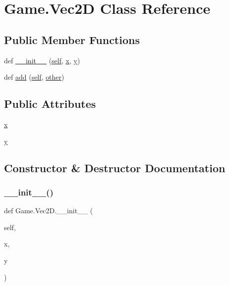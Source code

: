 \hypertarget{class_game_1_1_vec2_d}{}\section{Game.\+Vec2D Class Reference}
\label{class_game_1_1_vec2_d}
\subsection*{Public Member Functions}
\begin{DoxyCompactItemize}
\item 
def \mbox{\hyperlink{class_game_1_1_vec2_d_a2c5addfb239915d80a23b78edbb86958}{\+\_\+\+\_\+init\+\_\+\+\_\+}} (\mbox{\hyperlink{modsupport_8h_a0180ca1808366e5da641475e8bf8cca3}{self}}, \mbox{\hyperlink{_s_d_l__opengl_8h_ad0e63d0edcdbd3d79554076bf309fd47}{x}}, \mbox{\hyperlink{_s_d_l__opengl_8h_a1675d9d7bb68e1657ff028643b4037e3}{y}})
\item 
def \mbox{\hyperlink{class_game_1_1_vec2_d_a78a89c05c6ec8f6432e2b020c1331105}{add}} (\mbox{\hyperlink{modsupport_8h_a0180ca1808366e5da641475e8bf8cca3}{self}}, \mbox{\hyperlink{dictobject_8h_abd4733e17e86acb453bda62bc8b96adf}{other}})
\end{DoxyCompactItemize}
\subsection*{Public Attributes}
\begin{DoxyCompactItemize}
\item 
\mbox{\hyperlink{class_game_1_1_vec2_d_ab2c0014ad0db9e875903d45f730330d2}{x}}
\item 
\mbox{\hyperlink{class_game_1_1_vec2_d_a068fdc17613b855c4974fb2fd2ae047c}{y}}
\end{DoxyCompactItemize}


\subsection{Constructor \& Destructor Documentation}
\mbox{\label{class_game_1_1_vec2_d_a2c5addfb239915d80a23b78edbb86958}} 
\subsubsection{\texorpdfstring{\_\_init\_\_()}{\_\_init\_\_()}}
{\footnotesize\ttfamily def Game.\+Vec2\+D.\+\_\+\+\_\+init\+\_\+\+\_\+ (\begin{DoxyParamCaption}\item[{}]{self,  }\item[{}]{x,  }\item[{}]{y }\end{DoxyParamCaption})}



